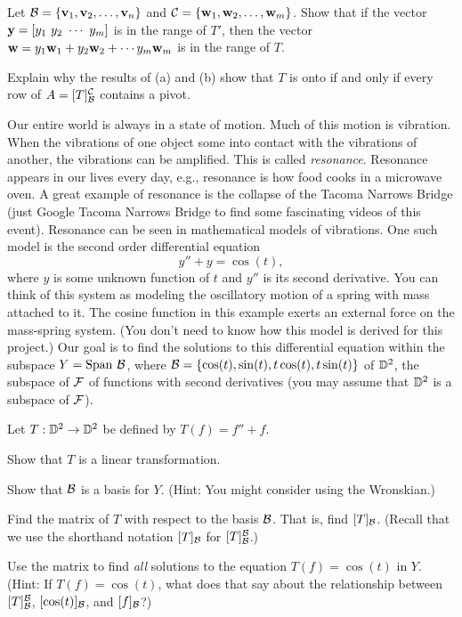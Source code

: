 \item Let $\mathcal{B} = \{\mathbf{v}_1, \mathbf{v}_2, \ldots, \mathbf{v}_n\}$ and $\mathcal{C} = \{\mathbf{w}_1, \mathbf{w}_2, \ldots, \mathbf{w}_m\}$. Show that if the vector $\mathbf{y} = [y_1 \ y_2 \ \cdots \ y_m]$ is in the range of $T'$, then the vector $\mathbf{w} = y_1\mathbf{w}_1 + y_2 \mathbf{w}_2 + \cdots y_m \mathbf{w}_m$ is in the range of $T$.  


\item Explain why the results of (a) and (b) show that $T$ is onto if and only if every row of $A = [T]_{\mathcal{B}}^{\mathcal{C}}$ contains a pivot.


\ea


\item Our entire world is always in a state of motion. Much of this motion is vibration. When the vibrations of one object some into contact with the vibrations of another, the vibrations can be amplified. This is called \emph{resonance}. Resonance appears in our lives every day, e.g., resonance is how food cooks in a microwave oven. A great example of resonance is the collapse of the Tacoma Narrows Bridge (just Google Tacoma Narrows Bridge to find some fascinating videos of this event). Resonance can be seen in mathematical models of vibrations. One such model is the second order differential equation 
\[y'' + y = \cos(t),\]
where $y$ is some unknown function of $t$ and $y''$ is its second derivative. You can think of this system as modeling the oscillatory motion of a spring with mass attached to it. The cosine function in this example exerts an external force on the mass-spring system. (You don't need to know how this model is derived for this project.) Our goal is to find the solutions to this differential equation within the subspace $Y = \Span \ \CB$, where $\mathcal{B} = \{\cos(t), \sin(t), t\cos(t), t\sin(t)\}$ of $\mathbb{D}^2$, the subspace of $\mathcal{F}$ of functions with second derivatives (you may assume that $\mathbb{D}^2$ is a subspace of $\mathcal{F}$). 

Let $T: \mathbb{D}^2 \to \mathbb{D}^2$ be defined by $T(f) = f'' + f$. 
	\ba
	\item Show that $T$ is a linear transformation.
	
	
	\item Show that $\mathcal{B}$ is a basis for $Y$. (Hint: You might consider using the Wronskian.)


	\item Find the matrix of $T$ with respect to the basis $\mathcal{B}$. That is, find $[T]_{\mathcal{B}}$. (Recall that we use the shorthand notation $[T]_{\mathcal{B}}$ for $[T]_{\mathcal{B}}^{\mathcal{B}}$.) 

	\item Use the matrix to find \emph{all} solutions to the equation $T(f) = \cos(t)$ in $Y$. (Hint: If $T(f) = \cos(t)$, what does that say about the relationship between $[T]_{\mathcal{B}}^{\mathcal{B}}$, $[\cos(t)]_{\mathcal{B}}$, and $[f]_{\mathcal{B}}$?)  
	

